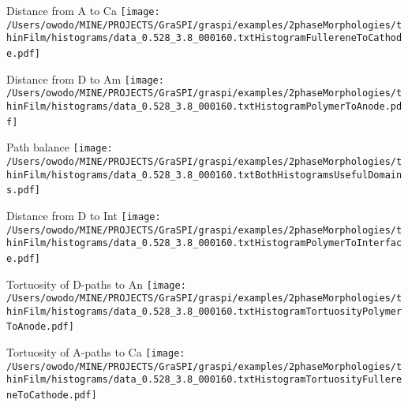 \documentclass{article}
\begin{document}
\parbox{0.60\textwidth}{
\parbox{0.3\textwidth}{\centering Distance from A to Ca \newline
\texttt{[image: /Users/owodo/MINE/PROJECTS/GraSPI/graspi/examples/2phaseMorphologies/thinFilm/histograms/data\_0.528\_3.8\_000160.txtHistogramFullereneToCathode.pdf]} \ ~ \ } 
\parbox{0.3\textwidth}{\centering Distance from D to Am \newline
\texttt{[image: /Users/owodo/MINE/PROJECTS/GraSPI/graspi/examples/2phaseMorphologies/thinFilm/histograms/data\_0.528\_3.8\_000160.txtHistogramPolymerToAnode.pdf]} \ ~ \ }
\parbox{0.3\textwidth}{\centering Path balance \newline 
\texttt{[image: /Users/owodo/MINE/PROJECTS/GraSPI/graspi/examples/2phaseMorphologies/thinFilm/histograms/data\_0.528\_3.8\_000160.txtBothHistogramsUsefulDomains.pdf]} \ ~ \ }
\parbox{0.3\textwidth}{\centering Distance from D to Int \newline 
\texttt{[image: /Users/owodo/MINE/PROJECTS/GraSPI/graspi/examples/2phaseMorphologies/thinFilm/histograms/data\_0.528\_3.8\_000160.txtHistogramPolymerToInterface.pdf]} \ ~ \ }
\parbox{0.3\textwidth}{\centering Tortuosity of D-paths to An  \newline
\texttt{[image: /Users/owodo/MINE/PROJECTS/GraSPI/graspi/examples/2phaseMorphologies/thinFilm/histograms/data\_0.528\_3.8\_000160.txtHistogramTortuosityPolymerToAnode.pdf]} \ ~ \ }
\parbox{0.3\textwidth}{\centering Tortuosity of A-paths to Ca \newline
\texttt{[image: /Users/owodo/MINE/PROJECTS/GraSPI/graspi/examples/2phaseMorphologies/thinFilm/histograms/data\_0.528\_3.8\_000160.txtHistogramTortuosityFullereneToCathode.pdf]} \ ~ \ }
}
\newpage
\end{document}
